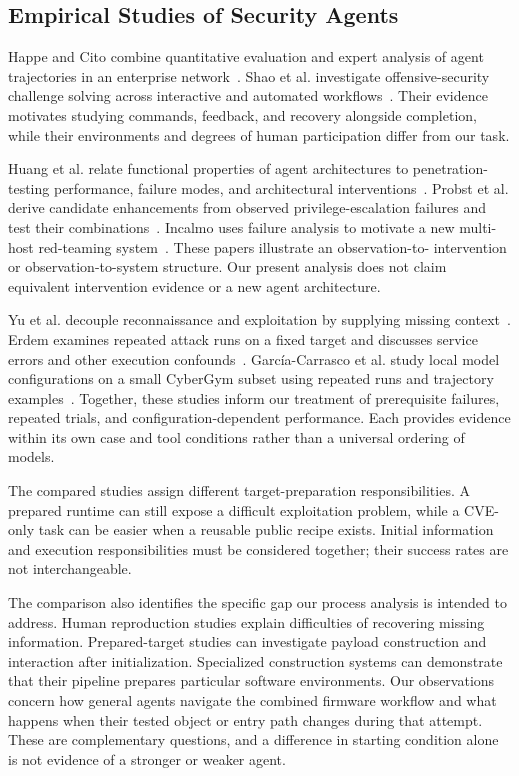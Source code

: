 \subsection{Empirical Studies of Security Agents}

Happe and Cito combine quantitative evaluation and expert analysis of
agent trajectories in an enterprise network~\cite{happe2026enterprisenetworks}.
Shao et al. investigate offensive-security challenge solving across
interactive and automated workflows~\cite{shao2024offensivestudy}.
Their evidence motivates studying commands, feedback, and recovery
alongside completion, while their environments and degrees of human
participation differ from our task.

Huang et al. relate functional properties of agent architectures to
penetration-testing performance, failure modes, and architectural
interventions~\cite{huang2025capabilitiesperformance}. Probst et al.
derive candidate enhancements from observed privilege-escalation failures
and test their combinations~\cite{probst2026localprivesc}. Incalmo uses
failure analysis to motivate a new multi-host red-teaming
system~\cite{singer2026incalmo}. These papers illustrate an observation-to-
intervention or observation-to-system structure. Our present analysis
does not claim equivalent intervention evidence or a new agent architecture.

Yu et al. decouple reconnaissance and exploitation by supplying missing
context~\cite{yu2026decoupling}. Erdem examines repeated attack runs on
a fixed target and discusses service errors and other execution
confounds~\cite{erdem2026consistency}. Garc\'{i}a-Carrasco et al. study
local model configurations on a small CyberGym subset using repeated runs
and trajectory examples~\cite{garcia2026local}. Together, these studies
inform our treatment of prerequisite failures, repeated trials, and
configuration-dependent performance. Each provides evidence within its
own case and tool conditions rather than a universal ordering of models.

The compared studies assign different target-preparation responsibilities.
A prepared runtime can still expose a difficult exploitation problem,
while a CVE-only task can be easier when a reusable public recipe exists.
Initial information and execution responsibilities must be considered
together; their success rates are not interchangeable.


The comparison also identifies the specific gap our process analysis is
intended to address. Human reproduction studies explain difficulties of
recovering missing information. Prepared-target studies can investigate
payload construction and interaction after initialization. Specialized
construction systems can demonstrate that their pipeline prepares
particular software environments. Our observations concern how general
agents navigate the combined firmware workflow and what happens when
their tested object or entry path changes during that attempt. These are
complementary questions, and a difference in starting condition alone is
not evidence of a stronger or weaker agent.

